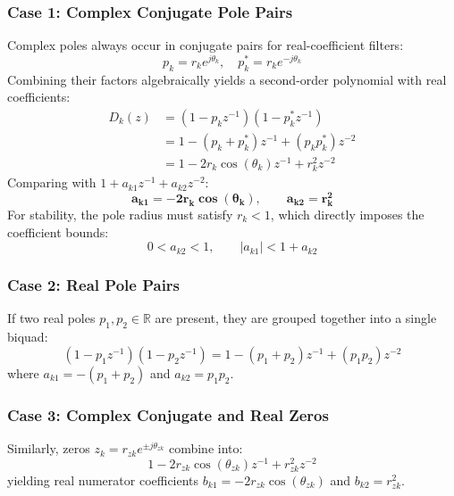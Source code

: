 \documentclass[11pt,a4paper]{article}
\begin{document}
\subsubsection{Case 1: Complex Conjugate Pole Pairs}
Complex poles always occur in conjugate pairs for real-coefficient filters:
\begin{equation}
p_k = r_k e^{j\theta_k}, \quad p_k^* = r_k e^{-j\theta_k}
\end{equation}
Combining their factors algebraically yields a second-order polynomial with real coefficients:
\begin{align}
D_k(z) &= (1 - p_k z^{-1})(1 - p_k^* z^{-1}) \nonumber \\
&= 1 - (p_k + p_k^*) z^{-1} + (p_k p_k^*) z^{-2} \nonumber \\
&= 1 - 2 r_k \cos(\theta_k) z^{-1} + r_k^2 z^{-2}
\label{eq:biquad_denom}
\end{align}
Comparing with $1 + a_{k1} z^{-1} + a_{k2} z^{-2}$:
\begin{equation}
\mathbf{a_{k1} = -2 r_k \cos(\theta_k)}, \qquad \mathbf{a_{k2} = r_k^2}
\end{equation}
For stability, the pole radius must satisfy $r_k < 1$, which directly imposes the coefficient bounds:
\begin{equation}
0 < a_{k2} < 1, \qquad |a_{k1}| < 1 + a_{k2}
\end{equation}

\subsubsection{Case 2: Real Pole Pairs}
If two real poles $p_1, p_2 \in \mathbb{R}$ are present, they are grouped together into a single biquad:
\begin{equation}
(1 - p_1 z^{-1})(1 - p_2 z^{-1}) = 1 - (p_1 + p_2) z^{-1} + (p_1 p_2) z^{-2}
\end{equation}
where $a_{k1} = -(p_1 + p_2)$ and $a_{k2} = p_1 p_2$.

\subsubsection{Case 3: Complex Conjugate and Real Zeros}
Similarly, zeros $z_k = r_{zk} e^{\pm j\theta_{zk}}$ combine into:
\begin{equation}
1 - 2 r_{zk} \cos(\theta_{zk}) z^{-1} + r_{zk}^2 z^{-2}
\end{equation}
yielding real numerator coefficients $b_{k1} = -2 r_{zk} \cos(\theta_{zk})$ and $b_{k2} = r_{zk}^2$.
\end{document}
